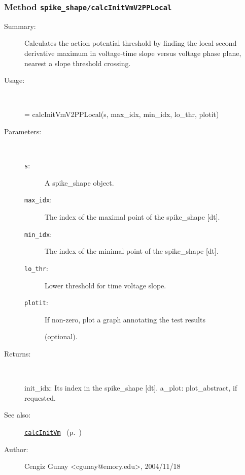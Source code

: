 \subsubsection[Method \texttt{calcInitVmV2PPLocal}]{Method \texttt{spike\_shape/calcInitVmV2PPLocal}}%
%
\label{ref_spike_shape__calcInitVmV2PPLocal}%
\hypertarget{ref_spike_shape__calcInitVmV2PPLocal}{}%
\begin{description}
\item[Summary:]Calculates the action potential threshold by finding the local second derivative maximum in voltage-time slope versus voltage phase plane, nearest a slope threshold crossing.
%
\item[Usage:]~%
\begin{lyxcode}%
[init\_idx, a\_plot] = calcInitVmV2PPLocal(s, max\_idx, min\_idx, lo\_thr, plotit)
%
\end{lyxcode}%
%
%
\item[Parameters:]~
\begin{description}%
\item[\texttt{s}:]
 A spike\_shape object.
\item[\texttt{max\_idx}:]
 The index of the maximal point of the spike\_shape [dt].
\item[\texttt{min\_idx}:]
 The index of the minimal point of the spike\_shape [dt].
\item[\texttt{lo\_thr}:]
 Lower threshold for time voltage slope.
\item[\texttt{plotit}:]
 If non-zero, plot a graph annotating the test results 

(optional).\end{description}%
%
\item[Returns:]~

	init\_idx: Its index in the spike\_shape [dt].
	a\_plot: plot\_abstract, if requested.
%
%
\item[See also:]%
\hyperlink{ref_calcInitVm}{\texttt{calcInitVm}}%
\ (p.~\pageref{ref_calcInitVm})%
%
%
\item[Author:]%
Cengiz Gunay <cgunay@emory.edu>, 2004/11/18%
\end{description}
\methodline%
